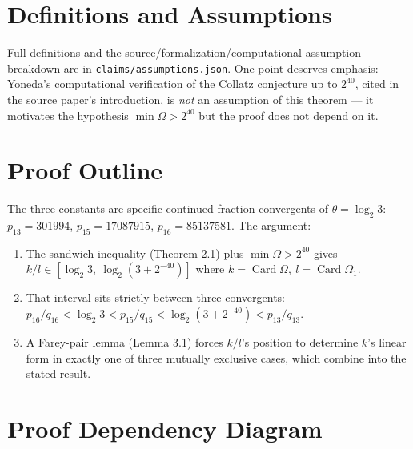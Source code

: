 \documentclass[11pt]{article}
\begin{document}
\section{Definitions and Assumptions}
Full definitions and the source/formalization/computational assumption
breakdown are in \texttt{claims/assumptions.json}. One point deserves
emphasis: Yoneda's computational verification of the Collatz conjecture up
to $2^{40}$, cited in the source paper's introduction, is \emph{not} an
assumption of this theorem --- it motivates the hypothesis $\min\Omega>2^{40}$
but the proof does not depend on it.

\section{Proof Outline}
The three constants are specific continued-fraction convergents of $\theta=\log_2 3$: $p_{13}=301994$, $p_{15}=17087915$, $p_{16}=85137581$. The argument:
\begin{enumerate}
\item The sandwich inequality (Theorem 2.1) plus $\min\Omega>2^{40}$ gives $k/l \in [\log_2 3,\ \log_2(3+2^{-40})]$ where $k=\operatorname{Card}\Omega,\ l=\operatorname{Card}\Omega_1$.
\item That interval sits strictly between three convergents: $p_{16}/q_{16} < \log_2 3 < p_{15}/q_{15} < \log_2(3+2^{-40}) < p_{13}/q_{13}$.
\item A Farey-pair lemma (Lemma 3.1) forces $k/l$'s position to determine $k$'s linear form in exactly one of three mutually exclusive cases, which combine into the stated result.
\end{enumerate}

\section{Proof Dependency Diagram}
\begin{center}
\end{center}
\end{document}
